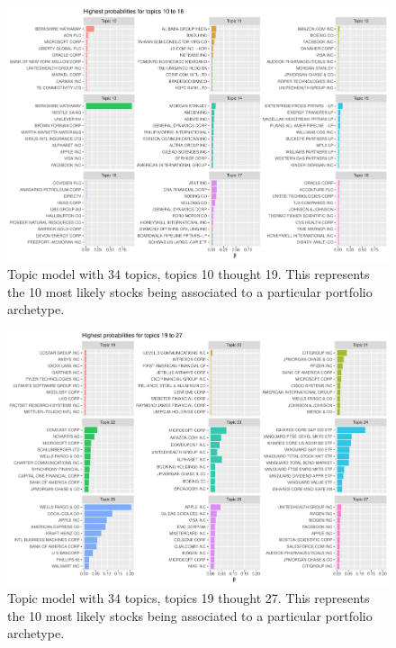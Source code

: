\begin{figure}
	\centering
	\includegraphics[width=\linewidth]{Figures/ChapterV/LDA34_10_18}
	\caption[Topic Model with 34 Topics, Topics 10 thought 19]{Topic model with 34 topics, topics 10 thought 19. This represents the 10 most likely stocks being associated to a particular portfolio archetype.}
	\label{fig:lda34-10-18}
\end{figure}

\begin{figure}
	\centering
	\includegraphics[width=\linewidth]{Figures/ChapterV/LDA34_19_27}
	\caption[Topic Model with 34 Topics, Topics 19 thought 27]{Topic model with 34 topics, topics 19 thought 27. This represents the 10 most likely stocks being associated to a particular portfolio archetype.}
	\label{fig:lda34-19-27}
\end{figure}

